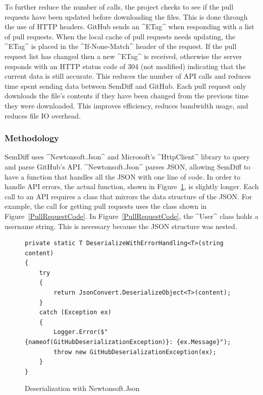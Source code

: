 \documentclass[draftclsnofoot,onecolumn]{IEEEtran}
\begin{document}
To further reduce the number of calls, the project checks to see if the pull 
requests have been updated before downloading the files. This is done through 
the use of HTTP headers. GitHub sends an ^ETag^ when responding with a list of 
pull requests. When the local cache of pull requests needs updating, the ^ETag^ 
is placed in the ^If-None-Match^ header of the request. If the pull request 
list has changed then a new ^ETag^ is received, otherwise the server responds 
with an HTTP status code of 304 (not modified) indicating that the current 
data is still accurate. This reduces the number of API calls and reduces time 
spent sending data between SemDiff and GitHub. Each pull request only 
downloads the file's contents if they have been changed from the previous time 
they were downloaded. This improves efficiency, reduces bandwidth usage, and 
reduces file IO overhead. 

\subsubsection{Methodology}

SemDiff uses ^Newtonsoft.Json^ and Microsoft's ^HttpClient^ library to query 
and parse GitHub's API. ^Newtonsoft.Json^ parses JSON, allowing SemDiff to 
have a function that handles all the JSON with one line of code. In order to 
handle API errors, the actual function, shown in 
Figure~\ref{deserializeNewtonsoft}, is slightly longer. Each call to an API 
requires a class that mirrors the data structure of the JSON. For example, the 
call for getting pull requests uses the class shown in 
Figure~\ref{PullRequestCode}. In Figure~\ref{PullRequestCode}, the ^User^ 
class holds a username string. This is necessary because the JSON structure 
was nested.

\begin{figure}[!htb]
\centering
\begin{lstlisting}
private static T DeserializeWithErrorHandling<T>(string content)
{
    try
    {
        return JsonConvert.DeserializeObject<T>(content);
    }
    catch (Exception ex)
    {
        Logger.Error($"{nameof(GitHubDeserializationException)}: {ex.Message}");
        throw new GitHubDeserializationException(ex);
  	}
}
\end{lstlisting}
\caption{Deserialization with Newtonsoft.Json}
\label{deserializeNewtonsoft}
\end{figure}
\end{document}
